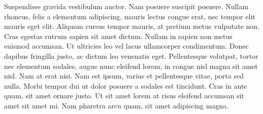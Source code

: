 Suspendisse gravida vestibulum auctor. Nam posuere suscipit posuere. Nullam rhoncus, felis a elementum adipiscing, mauris lectus congue erat, nec tempor elit mauris eget elit. Aliquam cursus tempor mauris, at pretium metus vulputate non. Cras egestas rutrum sapien sit amet dictum. Nullam in sapien non metus euismod accumsan. Ut ultricies leo vel lacus ullamcorper condimentum. Donec dapibus fringilla justo, ac dictum leo venenatis eget. Pellentesque volutpat, tortor nec elementum sodales, augue nunc eleifend lorem, in congue nisl magna sit amet nisl. Nam at erat nisi. Nam est ipsum, varius et pellentesque vitae, porta sed nulla. Morbi tempor dui ut dolor posuere a sodales est tincidunt. Cras in ante quam, sit amet ornare justo. Ut sit amet lorem at risus eleifend accumsan sit amet sit amet mi. Nam pharetra arcu quam, sit amet adipiscing magna.
